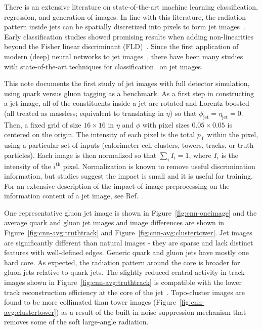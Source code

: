 There is an extensive literature on state-of-the-art machine learning classification, regression, and generation of images.  
In line with this literature, the radiation pattern inside jets can be spatially discretized into pixels to form jet images~\cite{Cogan:2014oua}.  
Early classification studies showed promising results when adding non-linearities beyond the Fisher linear discriminant (FLD)~\cite{Cogan:2014oua,Almeida:2015jua}.  Since the first application of modern (deep) neural networks to jet images~\cite{deOliveira:2015xxd}, there have been many studies with state-of-the-art techniques for classification~\cite{Komiske:2016rsd,Barnard:2016qma,Kasieczka:2017nvn,Baldi:2016fql,Louppe:2017ipp} on jet images. %

This note documents the first study of jet images with full detector simulation, using quark versus gluon tagging as a benchmark.  As a first step in constructing a jet image, all of the constituents inside a jet are rotated and Lorentz boosted (all treated as massless; equivalent to translating in $\eta$) so that $\phi_\text{jet}=\eta_\text{jet}=0$.  Then, a fixed grid of size $16\times 16$ in $\eta$ and $\phi$ with pixel sizes $0.05\times 0.05$ is centered on the origin.  The intensity of each pixel is the total $p_\text{T}$ within the pixel, using a particular set of inputs (calorimeter-cell clusters, towers, tracks, or truth particles).  Each image is then normalized so that $\sum_i I_i=1$, where $I_i$ is the intensity of the $i^\text{th}$ pixel.  Normalization is known to remove useful discrimination information, but studies suggest the impact is small and it is useful for training. For an extensive description of the impact of image preprocessing on the information content of a jet image, see Ref.~\cite{deOliveira:2015xxd}.

One representative gluon jet image is shown in Figure~\ref{fig:cnn-oneimage} and the average quark and gluon jet images and image differences are shown in Figure~\ref{fig:cnn-avg:truthtrack} and Figure~\ref{fig:cnn-avg:clustertower}.  
Jet images are significantly different than natural images - they are sparse and lack distinct features with well-defined edges.  
Generic quark and gluon jets have mostly one hard core.  As expected, the radiation pattern around the core is broader for gluon jets relative to quark jets.
The slightly reduced central activity in track images shown in Figure~\ref{fig:cnn-avg:truthtrack} is compatible with the lower track reconstruction efficiency at the core of the jet~\cite{Aaboud:2017all}.
Topo-cluster images are found to be more collimated than tower images (Figure~\ref{fig:cnn-avg:clustertower}) as a result of the built-in noise suppression
mechanism that removes some of the soft large-angle radiation.

